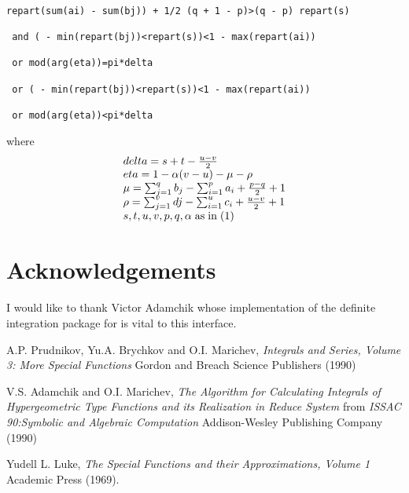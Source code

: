 \begin{verbatim}
                         
repart(sum(ai) - sum(bj)) + 1/2 (q + 1 - p)>(q - p) repart(s)
                         
 and ( - min(repart(bj))<repart(s))<1 - max(repart(ai)) 

 or mod(arg(eta))=pi*delta

 or ( - min(repart(bj))<repart(s))<1 - max(repart(ai)) 

 or mod(arg(eta))<pi*delta

\end{verbatim}

where
\begin{displaymath}
\begin{array}{ll}
delta = s+t-\frac{u-v}{2}\\
eta = 1-\alpha(v-u)-\mu-\rho\\
\mu = \sum_{j=1}^{q} b_{j} - \sum_{i=1}^{p} a_{i} + \frac{p-q}{2} + 1\\
\rho = \sum_{j=1}^{v} d{j} - \sum_{i=1}^{u} c_{i} + \frac{u-v}{2} + 1\\
s,t,u,v,p,q,\alpha \; {\rm as \; in \; (1)}
\end{array}
\end{displaymath}


\section{Acknowledgements}
I would like to thank Victor Adamchik whose implementation of the 
definite integration package for \REDUCE is vital to this
interface.  


\begin{thebibliography}{}

 A.P. Prudnikov, Yu.A. Brychkov and O.I. Marichev,
{\em Integrals and Series, Volume 3: More Special Functions} Gordon 
and Breach Science Publishers (1990)

 V.S. Adamchik and O.I. Marichev, {\em The 
Algorithm for Calculating Integrals of Hypergeometric Type Functions 
and its Realization in Reduce System} from {\em ISSAC 90:Symbolic and 
Algebraic Computation} Addison-Wesley Publishing Company (1990) 

 Yudell L. Luke, {\em The Special Functions and their
Approximations, Volume 1} Academic Press (1969).

\end{thebibliography}



